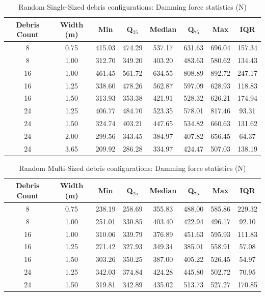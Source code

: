 \documentclass{article}
\begin{document}
\begin{table}[h!]
\centering
\caption{Random Single-Sized debris configurations: Damming force statistics (N)}
\begin{tabular}{cccccccc}
\toprule
\textbf{Debris Count} & \textbf{Width (m)} & \textbf{Min} & \textbf{Q$_{25}$} & \textbf{Median} & \textbf{Q$_{75}$} & \textbf{Max} & \textbf{IQR} \\
\midrule
8 & 0.75 & 415.03 & 474.29 & 537.17 & 631.63 & 696.04 & 157.34 \\
8 & 1.00 & 312.70 & 349.20 & 403.20 & 483.63 & 580.62 & 134.43 \\
16 & 1.00 & 461.45 & 561.72 & 634.55 & 808.89 & 892.72 & 247.17 \\
16 & 1.25 & 338.60 & 478.26 & 562.87 & 597.09 & 628.93 & 118.83 \\
16 & 1.50 & 313.93 & 353.38 & 421.91 & 528.32 & 626.21 & 174.94 \\
24 & 1.25 & 406.77 & 484.70 & 523.35 & 578.01 & 817.46 & 93.31 \\
24 & 1.50 & 324.74 & 403.21 & 447.65 & 534.82 & 660.63 & 131.62 \\
24 & 2.00 & 299.56 & 343.45 & 384.97 & 407.82 & 656.45 & 64.37 \\
24 & 3.65 & 209.92 & 286.28 & 334.97 & 424.47 & 507.03 & 138.19 \\
\bottomrule
\end{tabular}
\end{table}

\begin{table}[h!]
\centering
\caption{Random Multi-Sized debris configurations: Damming force statistics (N)}
\begin{tabular}{cccccccc}
\toprule
\textbf{Debris Count} & \textbf{Width (m)} & \textbf{Min} & \textbf{Q$_{25}$} & \textbf{Median} & \textbf{Q$_{75}$} & \textbf{Max} & \textbf{IQR} \\
\midrule
8 & 0.75 & 238.19 & 258.69 & 355.83 & 488.00 & 585.86 & 229.32 \\
8 & 1.00 & 251.01 & 330.85 & 403.40 & 422.94 & 496.17 & 92.10 \\
16 & 1.00 & 310.06 & 339.79 & 376.89 & 451.63 & 595.93 & 111.83 \\
16 & 1.25 & 271.42 & 327.93 & 349.34 & 385.01 & 558.91 & 57.08 \\
16 & 1.50 & 303.26 & 350.25 & 387.00 & 405.22 & 526.45 & 54.97 \\
24 & 1.25 & 342.03 & 374.84 & 424.28 & 445.80 & 502.72 & 70.95 \\
24 & 1.50 & 319.81 & 342.89 & 435.02 & 513.73 & 527.27 & 170.85 \\
\bottomrule
\end{tabular}
\end{table}
\end{document}
